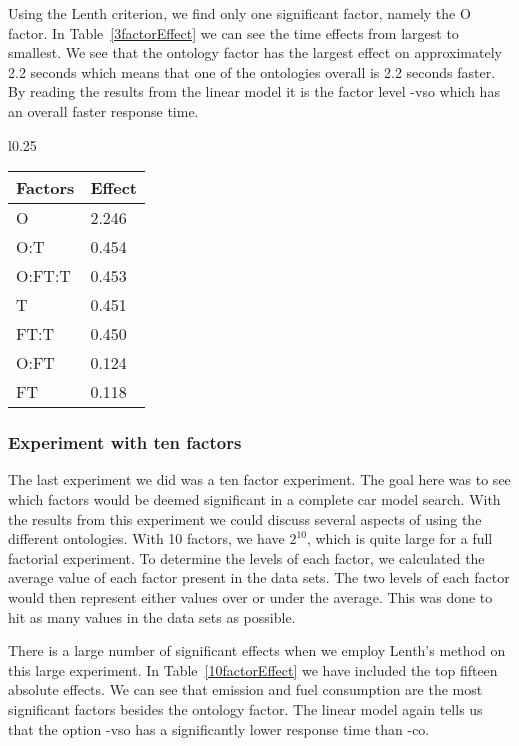 \documentclass{llncs}
\begin{document}
Using the Lenth criterion, we find only one significant factor, namely
the \textsf{O} factor. In Table~\ref{3factorEffect} we can see the
time effects from largest to smallest.  We see that the ontology
factor has the largest effect on approximately 2.2 seconds which means
that one of the ontologies overall is 2.2 seconds faster. By reading
the results from the linear model it is the factor level \textsf{-vso}
which has an overall faster response time.

\begin{wraptable}{l}{0.25\textwidth}
\vspace{-35pt}
    \begin{tabular}{ | l l |}
    \hline
    {\bf Factors} & {\bf Effect}  \\ \hline
	  O     & 2.246\\ \hline
	  O:T    &0.454 \\ \hline
	  O:FT:T &0.453 \\ \hline
	  T      &0.451 \\ \hline
	  FT:T   &0.450 \\ \hline
	  O:FT   &0.124 \\ \hline
	  FT     &0.118 \\ \hline
    \end{tabular}
\caption{Table of absolute effects for the three factor experiment}\label{3factorEffect}
\vspace{-15pt}
\end{wraptable} 

\subsubsection{Experiment with ten factors}
The last experiment we did was a ten factor experiment. The goal here
was to see which factors would be deemed significant in a complete car
model search. With the results from this experiment we could discuss
several aspects of using the different ontologies.  
With 10 factors, we have $2^{10}$, which is quite large for a full
factorial experiment.
To determine the levels of each factor, we calculated the average value 
of each factor present in the data sets. The two levels of each factor would then 
represent either values over or under the average. This was done to hit 
as many values in the data sets as possible. %

There is a large number of significant effects when we employ Lenth's
method on this large experiment. In Table~\ref{10factorEffect} we have
included the top fifteen absolute effects. We can see that emission
and fuel consumption are the most significant factors besides the
ontology factor.  The linear model again tells us that the option
\textsf{-vso} has a significantly lower response time than
\textsf{-co}.
\end{document}
